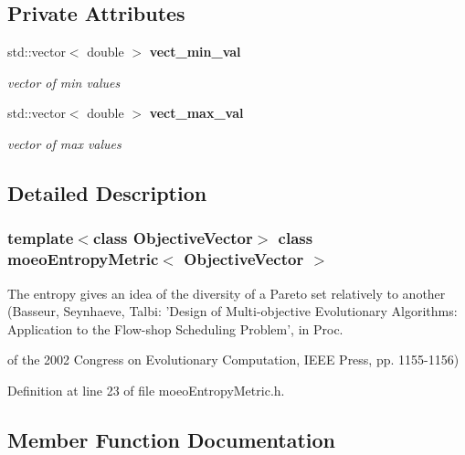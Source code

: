 \subsection*{Private Attributes}
\begin{CompactItemize}
\item 
std::vector$<$ double $>$ {\bf vect\_\-min\_\-val}\label{classmoeoEntropyMetric_e423d7d4416ef371ce7b0fd24c3212f8}

\begin{CompactList}\small\item\em vector of min values \item\end{CompactList}\item 
std::vector$<$ double $>$ {\bf vect\_\-max\_\-val}\label{classmoeoEntropyMetric_f5fad6d144520fd1403f774f98b18b99}

\begin{CompactList}\small\item\em vector of max values \item\end{CompactList}\end{CompactItemize}


\subsection{Detailed Description}
\subsubsection*{template$<$class Objective\-Vector$>$ class moeo\-Entropy\-Metric$<$ Objective\-Vector $>$}

The entropy gives an idea of the diversity of a Pareto set relatively to another (Basseur, Seynhaeve, Talbi: 'Design of Multi-objective Evolutionary Algorithms: Application to the Flow-shop Scheduling Problem', in Proc. 

of the 2002 Congress on Evolutionary Computation, IEEE Press, pp. 1155-1156) 



Definition at line 23 of file moeo\-Entropy\-Metric.h.

\subsection{Member Function Documentation}
